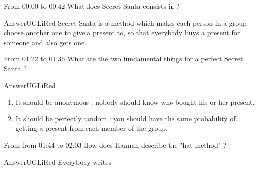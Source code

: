\documentclass[12pt,a4paper,article,english,firamath]{nsi}
\begin{document}
\maketitle

From 00:00 to 00:42 What does Secret Santa consists in ?
\begin{encadrecolore}{Answer}{UGLiRed}
Secret Santa is a method which makes each person in a group choose another one to give a present to, so that everybody buys a present for someone and also gets one.
\end{encadrecolore}
From 01:22 to 01:36 What are the two fundamental things for a perfect Secret Santa ?
\begin{encadrecolore}{Answer}{UGLiRed}
    \begin{enumerate}
        \item It should be anonymous : nobody should know who bought his or her present.
        \item It should be perfectly random : you should have the same probability of getting a present from each member of the group.
    \end{enumerate}
\end{encadrecolore}
From from 01:44 to 02:03 How does Hannah describe the "hat method" ?
\begin{encadrecolore}{Answer}{UGLiRed}
    Everybody writes 
\end{encadrecolore}
\end{document}
